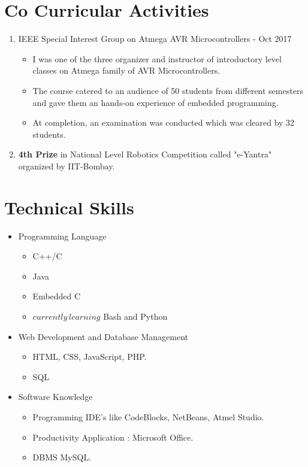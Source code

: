 \documentclass[11pt,a4paper,sans]{moderncv}        %
\begin{document}
\section{Co Curricular Activities}
\begin{enumerate}
	\item IEEE Special Interest Group on Atmega AVR Microcontrollers  - Oct 2017
	\begin{itemize}
		\item I was one of the three organizer and instructor of introductory level classes on Atmega family 
		of AVR Microcontrollers.
		\item The course catered to an audience of 50 students from different semesters and gave them an hands-on       experience of embedded programming.
		\item At completion, an examination was conducted which was cleared by 32 students.     
	\end{itemize}
    \item \textbf{4th Prize} in National Level Robotics Competition called "e-Yantra" organized by IIT-Bombay.
\end{enumerate}

\section{Technical Skills}
 \begin{itemize}
 	\item Programming Language 
 	\begin{itemize}
 		\item C++/C
 		\item Java
 		\item Embedded C
 		\item \(currently\, learning\) Bash and Python
 	\end{itemize}
    \item Web Development and Database Management  
    \begin{itemize}
    	\item HTML, CSS, JavaScript, PHP.
    	\item SQL 
    \end{itemize}
 	\item Software Knowledge 
 	\begin{itemize}
 		\item Programming IDE's like CodeBlocks, NetBeans, Atmel Studio.
 		\item Productivity Application : Microsoft Office.
 		\item DBMS MySQL.
 	\end{itemize}
 \end{itemize}
\end{document}
